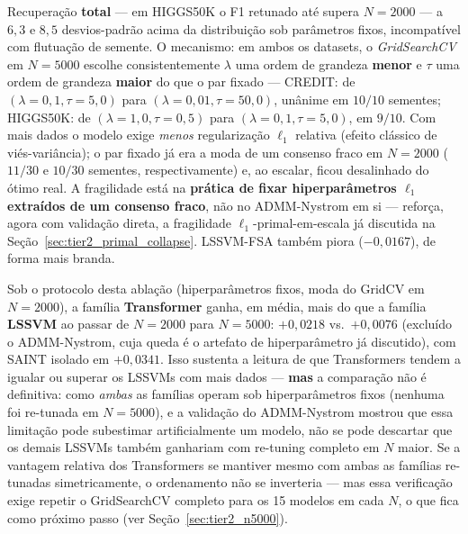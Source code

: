 \documentclass[12pt,a4paper]{article}
\begin{document}
\begin{tcolorbox}
Recuperação \textbf{total} --- em HIGGS50K o F1 retunado até supera $N=2000$
--- a $6{,}3$ e $8{,}5$ desvios-padrão acima da distribuição sob parâmetros
fixos, incompatível com flutuação de semente. O mecanismo: em ambos os
datasets, o \textit{GridSearchCV} em $N=5000$ escolhe consistentemente
$\lambda$ uma ordem de grandeza \textbf{menor} e $\tau$ uma ordem de grandeza
\textbf{maior} do que o par fixado --- CREDIT: de $(\lambda{=}0{,}1,
\tau{=}5{,}0)$ para $(\lambda{=}0{,}01,\tau{=}50{,}0)$, unânime em $10/10$
sementes; HIGGS50K: de $(\lambda{=}1{,}0,\tau{=}0{,}5)$ para
$(\lambda{=}0{,}1,\tau{=}5{,}0)$, em $9/10$. Com mais dados o modelo exige
\emph{menos} regularização $\ell_1$ relativa (efeito clássico de
viés-variância); o par fixado já era a moda de um consenso fraco em $N=2000$
($11/30$ e $10/30$ sementes, respectivamente) e, ao escalar, ficou
desalinhado do ótimo real. A fragilidade está na \textbf{prática de fixar
hiperparâmetros $\ell_1$ extraídos de um consenso fraco}, não no ADMM-Nystrom
em si --- reforça, agora com validação direta, a fragilidade
$\ell_1$-primal-em-escala já discutida na Seção~\ref{sec:tier2_primal_collapse}.
LSSVM-FSA também piora ($-0{,}0167$), de forma mais branda.
\end{tcolorbox}

\begin{tcolorbox}[colback=warnbg, colframe=warnborder, fonttitle=\bfseries,
  title=\textbf{Ressalva --- Transformers ganham mais que LSSVMs com $N$
  maior, mas a comparação usa hiperparâmetros fixos para ambas as famílias}]
Sob o protocolo desta ablação (hiperparâmetros fixos, moda do GridCV em
$N{=}2000$), a família \textbf{Transformer} ganha, em média, mais do que a
família \textbf{LSSVM} ao passar de $N{=}2000$ para $N{=}5000$:
$+0{,}0218$ vs.\ $+0{,}0076$ (excluído o ADMM-Nystrom, cuja queda é o
artefato de hiperparâmetro já discutido), com SAINT isolado em $+0{,}0341$.
Isso sustenta a leitura de que Transformers tendem a igualar ou superar os
LSSVMs com mais dados --- \textbf{mas} a comparação não é definitiva: como
\emph{ambas} as famílias operam sob hiperparâmetros fixos (nenhuma foi
re-tunada em $N{=}5000$), e a validação do ADMM-Nystrom mostrou que essa
limitação pode subestimar artificialmente um modelo, não se pode descartar
que os demais LSSVMs também ganhariam com re-tuning completo em $N$ maior.
Se a vantagem relativa dos Transformers se mantiver mesmo com ambas as
famílias re-tunadas simetricamente, o ordenamento não se inverteria --- mas
essa verificação exige repetir o GridSearchCV completo para os 15 modelos em
cada $N$, o que fica como próximo passo (ver Seção~\ref{sec:tier2_n5000}).
\end{tcolorbox}
\end{document}
